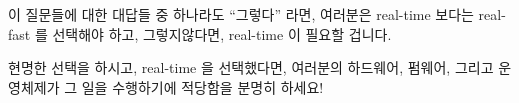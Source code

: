 이 질문들에 대한 대답들 중 하나라도 ``그렇다'' 라면, 여러분은 real-time 보다는
real-fast 를 선택해야 하고, 그렇지않다면, real-time 이 필요할 겁니다.

현명한 선택을 하시고, real-time 을 선택했다면, 여러분의 하드웨어, 펌웨어,
그리고 운영체제가 그 일을 수행하기에 적당함을 분명히 하세요!

